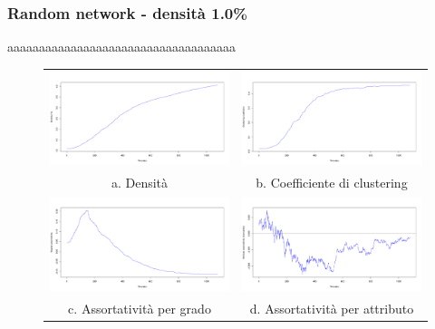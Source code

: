 \documentclass[a4paper,12pt]{article}
\begin{document}
\subsubsection{Random network - densità 1.0\%}
aaaaaaaaaaaaaaaaaaaaaaaaaaaaaaaaaaaa
\begin{figure}[h]
\begin{tabular}{cc}
  \includegraphics[width=81mm]{images/evolution_1000_rnd_1080_1_0.pdf} &   \includegraphics[width=81mm]{images/clustering_1000_rnd_1080_1_0.pdf} \\
a. Densità & b. Coefficiente di clustering \\[6pt]
 \includegraphics[width=81mm]{images/deg_assortativity_1000_rnd_1080_1_0.pdf} &   \includegraphics[width=81mm]{images/homophily_1000_rnd_1080_1_0.pdf} \\
c. Assortatività per grado & d. Assortatività per attributo \\[6pt]
\end{tabular}
\end{figure}
\newpage
\end{document}
